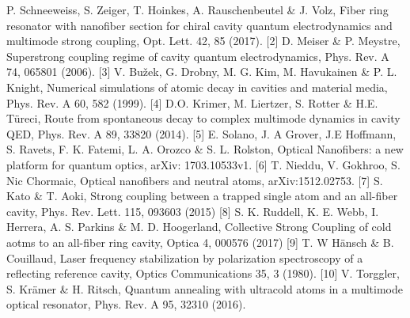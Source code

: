 \documentclass{scdpg}
\begin{document}
\begin{scAbstract}
[1] P. Schneeweiss, S. Zeiger, T. Hoinkes, A. Rauschenbeutel \& J. Volz, Fiber ring
resonator with nanofiber section for chiral cavity quantum electrodynamics and
multimode strong coupling, Opt. Lett. 42, 85 (2017).
[2] D. Meiser \& P. Meystre, Superstrong coupling regime of cavity quantum
electrodynamics, Phys. Rev. A 74, 065801 (2006).
[3] V. Bužek, G. Drobny, M. G. Kim, M. Havukainen \& P. L. Knight, Numerical simulations
of atomic decay in cavities and material media, Phys. Rev. A 60, 582 (1999).
[4] D.O. Krimer, M. Liertzer, S. Rotter \& H.E. Türeci, Route from spontaneous decay to
complex multimode dynamics in cavity QED, Phys. Rev. A 89, 33820 (2014).
[5] E. Solano, J. A Grover, J.E Hoffmann, S. Ravets, F. K. Fatemi, L. A. Orozco \& S. L.
Rolston, Optical Nanofibers: a new platform for quantum optics, arXiv: 1703.10533v1.
[6] T. Nieddu, V. Gokhroo, S. Nic Chormaic, Optical nanofibers and neutral atoms,
arXiv:1512.02753.
[7] S. Kato \& T. Aoki, Strong coupling between a trapped single atom and an all-fiber
cavity, Phys. Rev. Lett. 115, 093603 (2015)
[8] S. K. Ruddell, K. E. Webb, I. Herrera, A. S. Parkins \& M. D. Hoogerland, Collective
Strong Coupling of cold aotms to an all-fiber ring cavity, Optica 4, 000576 (2017)
[9] T. W Hänsch \& B. Couillaud, Laser frequency stabilization by polarization spectroscopy
of a reflecting reference cavity, Optics Communications 35, 3 (1980).
[10] V. Torggler, S. Krämer \& H. Ritsch, Quantum annealing with ultracold atoms in a
multimode optical resonator, Phys. Rev. A 95, 32310 (2016).


\scEndText
{}
\end{scAbstract}
\end{document}
